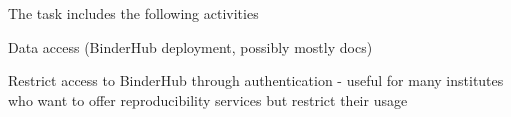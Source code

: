 \begin{task}[
  title=Support more use patterns,
  id=patterns,
  lead=SRL,
  PM=1,
  wphases={0-36},
  partners={MP}
]
  The task includes the following activities
  \begin{compactitem}
  \item Data access (BinderHub deployment, possibly mostly docs)
  \item Restrict access to BinderHub through authentication
    - useful for many institutes who want to offer reproducibility services but
    restrict their usage
  \end{compactitem}
\end{task}
